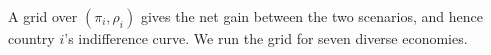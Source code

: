 \documentclass[12pt,english]{article}
\theoremstyle{remark}
\begin{document}
A grid over $(\pi_i,\rho_i)$ gives the net gain %
between the two scenarios,
and hence country $i$'s indifference curve. We run the grid for seven diverse economies. %
\end{document}
